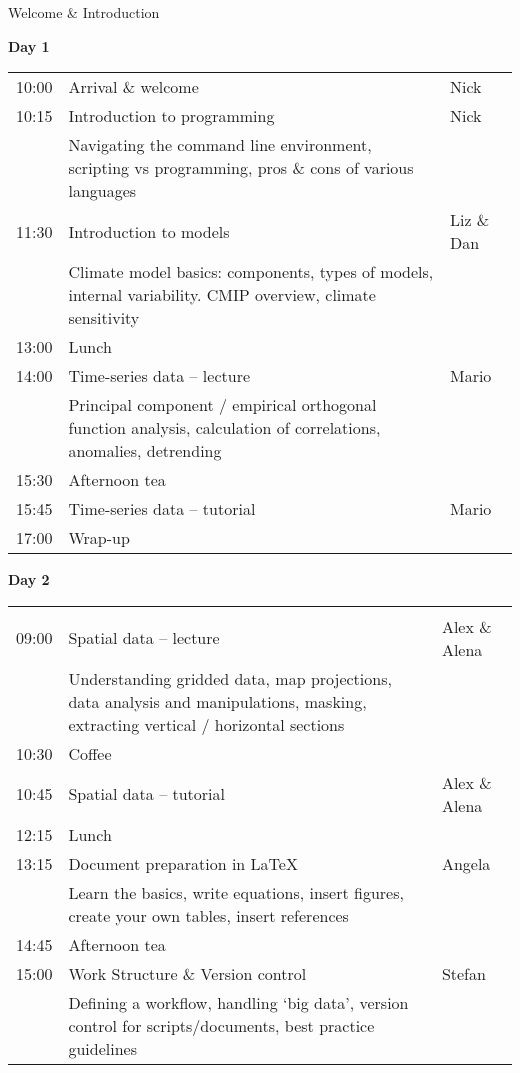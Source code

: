 


\begin{frame}{\insertframenumber{ |} Welcome \& Introduction}

%
\hspace*{-0.5cm}\textbf{Day 1} \\
\begin{tabular}{p{0.75cm}|p{7.5cm}|p{1.75cm}}
\hline 
10:00 & Arrival \& welcome & Nick \\
10:15 & Introduction to programming & Nick \\
& \tiny{Navigating the command line environment, scripting vs programming, pros \& cons of various languages} & \\
11:30 & Introduction to models & Liz \& Dan \\
& \tiny{Climate model basics: components, types of models, internal variability. CMIP overview, climate sensitivity} & \\
13:00 & Lunch &  \\
14:00 & Time-series data -- lecture & Mario \\
& \tiny{Principal component / empirical orthogonal function analysis, calculation of correlations, anomalies, detrending} & \\
15:30 & Afternoon tea &  \\
15:45 & Time-series data -- tutorial & Mario \\
17:00 & Wrap-up & \\
\hline
\end{tabular}


\hspace*{-0.5cm}\textbf{Day 2} \\
\begin{tabular}{p{0.75cm}|p{7.5cm}|p{1.75cm}}
\hline\\09:00 & Spatial data -- lecture & Alex \& Alena \\
& \tiny{Understanding gridded data, map projections, data analysis and manipulations, masking, extracting vertical / horizontal sections} & \\
10:30 & Coffee & \\
10:45 & Spatial data -- tutorial & Alex \& Alena \\
12:15 & Lunch & \\
13:15 & Document preparation in LaTeX & Angela \\
& \tiny{Learn the basics, write equations, insert figures, create your own tables, insert references} & \\
14:45 & Afternoon tea &  \\
15:00 & Work Structure \& Version control & Stefan \\
& \tiny{Defining a workflow, handling `big data', version control for scripts/documents, best practice guidelines} & \\
\hline
\end{tabular}




\end{frame}


